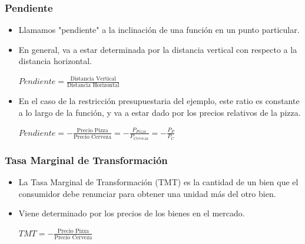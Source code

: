 \documentclass{beamer}
\begin{document}
\begin{frame}
\frametitle{Pendiente}
\begin{itemize}
    \item Llamamos "pendiente" a la inclinación de una función en un punto particular.
    \item En general, va a estar determinada por la distancia vertical con respecto a la distancia horizontal. \\ \vspace{2mm}
    \begin{center}
        $Pendiente = \frac{\text{Distancia Vertical}}
    {\text{Distancia Horizontal}}$
    \end{center}  \vspace{2mm}
    \item En el caso de la restricción presupuestaria del ejemplo, este ratio es constante a lo largo de la función, y va a estar dado por los precios relativos de la pizza. \\ \vspace{2mm}
     \begin{center}
    $Pendiente = - \frac{\text{Precio Pizza}}{\text{Precio Cerveza}}= -\frac{P_{Pizza}}{P_{Cerveza}}=-\frac{P_P}{P_C}$
    \end{center}
\end{itemize} 
\end{frame}


\begin{frame}
\frametitle{Tasa Marginal de Transformación}
\begin{itemize}
    \item La Tasa Marginal de Transformación (TMT) es la cantidad de un bien que el consumidor debe renunciar para obtener una unidad más del otro bien.
    \item Viene determinado por los precios de los bienes en el mercado.\\ \vspace{6mm} 
    \begin{center}
      $TMT = - \frac{\text{Precio Pizza}}{\text{Precio Cerveza}}$
      \end{center}
\end{itemize} 
\end{frame}
\end{document}
